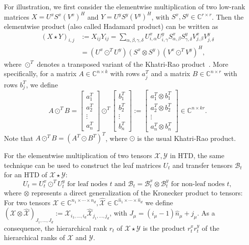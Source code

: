 \documentclass[11pt, a4paper]{article}
\newcommand{\calB}{\mathcal{B}}
\newcommand{\calX}{\mathcal{X}}
\newcommand{\calY}{\mathcal{Y}}
\newcommand{\C}{{\mathbb C}}
\renewcommand{\hat}{\widehat}
\begin{document}
For illustration, we first consider
the elementwise multiplication of two low-rank matrices 
$X = U^x S^x (V^x)^H$ and
$Y = U^y S^y (V^y)^H$,
with $S^x, S^y \in \C^{r \times r}$.
Then the elementwise product (also called Hadamard product) can be written as
\begin{align*}
(X \star Y)_{i,j} &:= X_{ij} Y_{ij} = \sum_{\alpha,\beta,\gamma,\delta} U^x_{i,\alpha} U^y_{i,\gamma} S^x_{\alpha,\beta} S^y_{\gamma,\delta} V^x_{j,\beta} V^y_{j,\delta}\\
& = (U^x \odot^T U^y) (S^x \otimes S^y) (V^x \odot^T V^y)^H,
\end{align*}
where $\odot^T$ denotes a transposed variant of the Khatri-Rao product~\cite{KolB09}. More specifically,
for a matrix $A \in \C^{n \times k}$ with rows $a_j^T$ and
a matrix $B \in \C^{n \times r}$ with rows $b_j^T$, we define
\[
A \odot^T B =
\begin{bmatrix} a_1^T \\ a_2^T \\ \vdots \\ a_n^T \end{bmatrix} \odot^T
\begin{bmatrix} b_1^T \\ b_2^T \\ \vdots \\ b_n^T \end{bmatrix} :=
\begin{bmatrix} a_1^T \otimes b_1^T \\ a_2^T \otimes b_2^T \\
  \vdots \\ a_n^T \otimes b_n^T \end{bmatrix} \in \C^{n \times kr}.
\]
Note that
$A \odot^T
B = (A^T \odot B^T)^T$, where $\odot$ is the usual Khatri-Rao product.

For the elementwise multiplication of two tensors $\calX, \calY$ in HTD, the same technique
can be used to construct the leaf matrices $U_t$ and transfer tensors $\calB_t$
for an HTD of $\calX\star \calY$:
\[
U_t = U^x_t \odot^T U^y_t \text{ for leaf nodes $t$ and } \calB_t = \calB_t^x \otimes \calB_t^y \text{ for non-leaf nodes $t$},
\]
where $\otimes$ represents 
a direct generalization of 
the Kronecker product to tensors: 
For two tensors 
$\calX \in \C^{n_1 \times \cdots \times n_d},
\hat{\calX} \in \C^{\hat{n}_1 \times \cdots \times \hat{n}_d}$
we define
$(\calX \otimes \hat{\calX})_{J_1, \ldots, J_d} 
:= \calX_{i_1,\ldots,i_d} \hat{\calX}_{j_1,\ldots,j_d}$, 
with $J_\mu = (i_\mu-1) \hat{n}_\mu + j_\mu$.
%
As a consequence,
the hierarchical rank $r_t$ of $\calX \star \calY$
is the product $r^x_t r^y_t$ 
of the hierarchical ranks
of $\calX$ and $\calY$.
\end{document}
